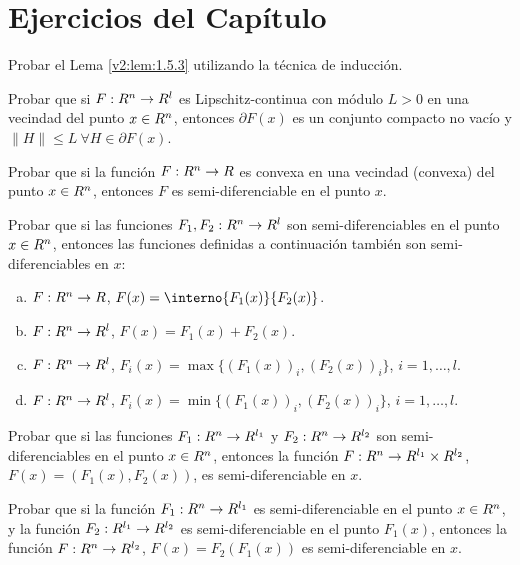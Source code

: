 
\section*{Ejercicios del Capítulo}

\begin{exercise}\label{v2:ejer:1.5.1}
    Probar el Lema \ref{v2:lem:1.5.3} utilizando la técnica de inducción.
\end{exercise}

\begin{exercise}\label{v2:ejer:1.6.1}
    Probar que si $F : R^n \to R^l$ es Lipschitz-continua con módulo $L > 0$ en una vecindad del punto $x \in R^n$, entonces $\partial F(x)$ es un conjunto compacto no vacío y $\|H\| \le L \ \forall H \in \partial F(x)$.
\end{exercise}

\begin{exercise}\label{v2:ejer:1.6.2}
    Probar que si la función $F : R^n \to R$ es convexa en una vecindad (convexa) del punto $x \in R^n$, entonces $F$ es semi-diferenciable en el punto $x$.
\end{exercise}

\begin{exercise}\label{v2:ejer:1.6.3}
    Probar que si las funciones $F_1, F_2 : R^n \to R^l$ son semi-diferenciables en el punto $x \in R^n$, entonces las funciones definidas a continuación también son semi-diferenciables en $x$:
    \begin{enumerate}[(a)]
        \item $F : R^n \to R$, $F(x) = \interno{F_1(x)}{F_2(x)}$.
        \item $F : R^n \to R^l$, $F(x) = F_1(x) + F_2(x)$.
        \item $F : R^n \to R^l$, $F_i(x) = \max\{(F_1(x))_i, (F_2(x))_i\}$, $i = 1, \dots, l$.
        \item $F : R^n \to R^l$, $F_i(x) = \min\{(F_1(x))_i, (F_2(x))_i\}$, $i = 1, \dots, l$.
    \end{enumerate}
\end{exercise}

\begin{exercise}\label{v2:ejer:1.6.4}
    Probar que si las funciones $F_1 : R^n \to R^{l_1}$ y $F_2 : R^n \to R^{l_2}$ son semi-diferenciables en el punto $x \in R^n$, entonces la función $F : R^n \to R^{l_1} \times R^{l_2}$, $F(x) = (F_1(x), F_2(x))$, es semi-diferenciable en $x$.
\end{exercise}

\begin{exercise}\label{v2:ejer:1.6.5}
    Probar que si la función $F_1 : R^n \to R^{l_1}$ es semi-diferenciable en el punto $x \in R^n$, y la función $F_2 : R^{l_1} \to R^{l_2}$ es semi-diferenciable en el punto $F_1(x)$, entonces la función $F : R^n \to R^{l_2}$, $F(x) = F_2(F_1(x))$ es semi-diferenciable en $x$.
\end{exercise}

